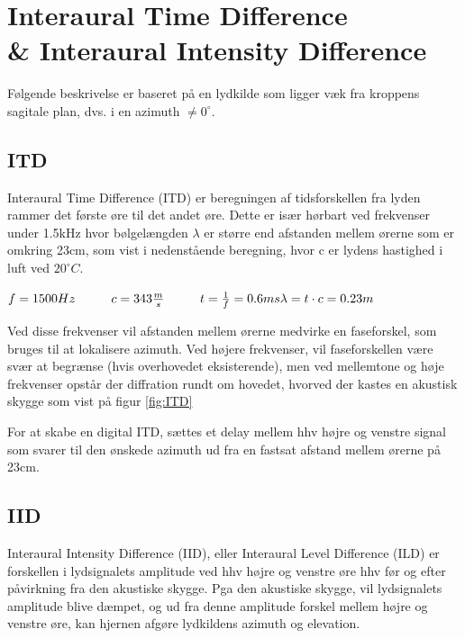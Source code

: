 \section{Interaural Time Difference\\ \& Interaural Intensity Difference}
\label{sec:ITD}

Følgende beskrivelse er baseret på en lydkilde som ligger væk fra kroppens sagitale plan, dvs. i en azimuth $ \ne 0^\circ$. 

\subsection{ITD}
Interaural Time Difference (ITD) er beregningen af tidsforskellen fra lyden rammer det første øre til det andet øre. Dette er især hørbart ved frekvenser under 1.5kHz hvor bølgelængden $\lambda$ er større end afstanden mellem ørerne som er omkring 23cm, som vist i nedenstående beregning, hvor c er lydens hastighed i luft ved $20^\circ C $.

\( f=1500Hz \hspace{1cm}  c=343\frac{m}{s} \hspace{1cm} t = \frac{1}{f} = 0.6ms  \\ \lambda = t \cdot c = 0.23m \)

Ved disse frekvenser vil afstanden mellem ørerne medvirke en faseforskel, som bruges til at lokalisere azimuth. Ved højere frekvenser, vil faseforskellen være svær at begrænse (hvis overhovedet eksisterende), men ved mellemtone og høje frekvenser opstår der diffration rundt om hovedet, hvorved der kastes en akustisk skygge som vist på figur \ref{fig:ITD}


For at skabe en digital ITD, sættes et delay mellem hhv højre og venstre signal som svarer til den ønskede azimuth ud fra en fastsat afstand mellem ørerne på 23cm.

\subsection{IID}

Interaural Intensity Difference (IID), eller Interaural Level Difference (ILD) er forskellen i lydsignalets amplitude ved hhv højre og venstre øre hhv før og efter påvirkning fra den akustiske skygge. Pga den akustiske skygge, vil lydsignalets amplitude blive dæmpet, og ud fra denne amplitude forskel mellem højre og venstre øre, kan hjernen afgøre lydkildens azimuth og elevation.

